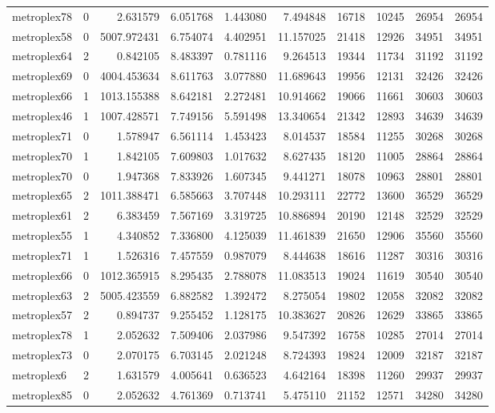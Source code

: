 \begin{longtable}{|l|r|r|r|r|r|r|r|r|r|}
metroplex78 & 0 & 2.631579 & 6.051768 & 1.443080 & 7.494848 & 16718 & 10245 & 26954 & 26954 \\
metroplex58 & 0 & 5007.972431 & 6.754074 & 4.402951 & 11.157025 & 21418 & 12926 & 34951 & 34951 \\
metroplex64 & 2 & 0.842105 & 8.483397 & 0.781116 & 9.264513 & 19344 & 11734 & 31192 & 31192 \\
metroplex69 & 0 & 4004.453634 & 8.611763 & 3.077880 & 11.689643 & 19956 & 12131 & 32426 & 32426 \\
metroplex66 & 1 & 1013.155388 & 8.642181 & 2.272481 & 10.914662 & 19066 & 11661 & 30603 & 30603 \\
metroplex46 & 1 & 1007.428571 & 7.749156 & 5.591498 & 13.340654 & 21342 & 12893 & 34639 & 34639 \\
metroplex71 & 0 & 1.578947 & 6.561114 & 1.453423 & 8.014537 & 18584 & 11255 & 30268 & 30268 \\
metroplex70 & 1 & 1.842105 & 7.609803 & 1.017632 & 8.627435 & 18120 & 11005 & 28864 & 28864 \\
metroplex70 & 0 & 1.947368 & 7.833926 & 1.607345 & 9.441271 & 18078 & 10963 & 28801 & 28801 \\
metroplex65 & 2 & 1011.388471 & 6.585663 & 3.707448 & 10.293111 & 22772 & 13600 & 36529 & 36529 \\
metroplex61 & 2 & 6.383459 & 7.567169 & 3.319725 & 10.886894 & 20190 & 12148 & 32529 & 32529 \\
metroplex55 & 1 & 4.340852 & 7.336800 & 4.125039 & 11.461839 & 21650 & 12906 & 35560 & 35560 \\
metroplex71 & 1 & 1.526316 & 7.457559 & 0.987079 & 8.444638 & 18616 & 11287 & 30316 & 30316 \\
metroplex66 & 0 & 1012.365915 & 8.295435 & 2.788078 & 11.083513 & 19024 & 11619 & 30540 & 30540 \\
metroplex63 & 2 & 5005.423559 & 6.882582 & 1.392472 & 8.275054 & 19802 & 12058 & 32082 & 32082 \\
metroplex57 & 2 & 0.894737 & 9.255452 & 1.128175 & 10.383627 & 20826 & 12629 & 33865 & 33865 \\
metroplex78 & 1 & 2.052632 & 7.509406 & 2.037986 & 9.547392 & 16758 & 10285 & 27014 & 27014 \\
metroplex73 & 0 & 2.070175 & 6.703145 & 2.021248 & 8.724393 & 19824 & 12009 & 32187 & 32187 \\
metroplex6 & 2 & 1.631579 & 4.005641 & 0.636523 & 4.642164 & 18398 & 11260 & 29937 & 29937 \\
metroplex85 & 0 & 2.052632 & 4.761369 & 0.713741 & 5.475110 & 21152 & 12571 & 34280 & 34280 \\

\end{longtable}
